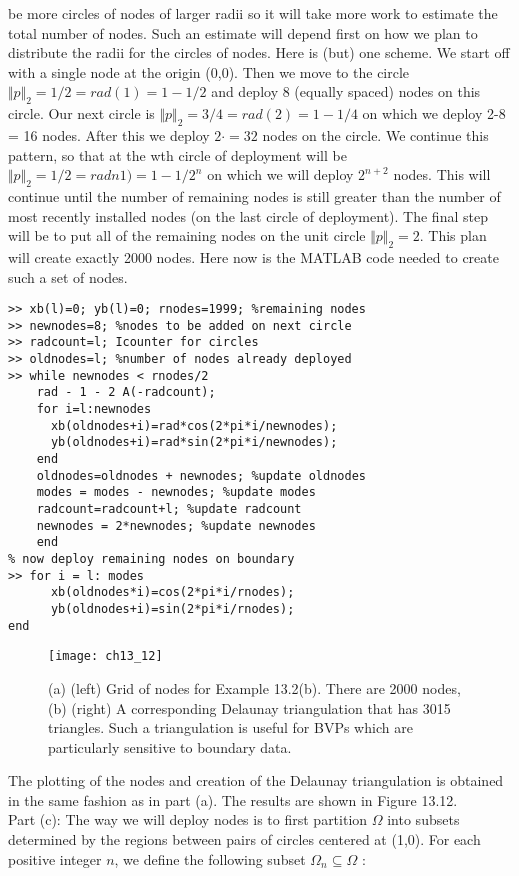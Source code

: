 \documentclass[../main.tex]{subfiles}
\begin{document}
be more circles of nodes of larger radii so it will take more work to estimate the total number of nodes. Such an estimate will depend first on how we plan to distribute the radii for the circles of nodes. Here is (but) one scheme. We start off with a single node at the origin (0,0). Then we move to the circle $\Vert p \Vert_2 =1/2=rad(1)=1-1/2$ and deploy 8 (equally spaced) nodes on this circle. Our next circle is $\Vert p \Vert_2 =3/4=rad(2)=1-1/4$ on which we deploy 2-8 = 16 nodes. After this we deploy $2\cdot = 32$ nodes on the circle. We continue this pattern, so that at the wth circle of deployment will be $\Vert p \Vert_2 =1/2=radn1)=1-1/2^n$ on which we will deploy $2^{n+2}$ nodes. This will continue until the number of remaining nodes is still greater than the number of most recently installed nodes (on the last circle of deployment). The final step will be to put all of the remaining nodes on the unit circle $\Vert p \Vert_2 =2$. This plan will create exactly 2000 nodes. Here now is the MATLAB code needed to create such a set of nodes. 

\begin{lstlisting}[numbers=none,frame=none]
>> xb(l)=0; yb(l)=0; rnodes=1999; %remaining nodes 
>> newnodes=8; %nodes to be added on next circle 
>> radcount=l; Icounter for circles 
>> oldnodes=l; %number of nodes already deployed 
>> while newnodes < rnodes/2 
	rad - 1 - 2 A(-radcount); 
	for i=l:newnodes 
	  xb(oldnodes+i)=rad*cos(2*pi*i/newnodes); 
	  yb(oldnodes+i)=rad*sin(2*pi*i/newnodes); 
	end 
	oldnodes=oldnodes + newnodes; %update oldnodes 
	modes = modes - newnodes; %update modes 
	radcount=radcount+l; %update radcount 
	newnodes = 2*newnodes; %update newnodes 
	end 
% now deploy remaining nodes on boundary 
>> for i = l: modes 
	  xb(oldnodes*i)=cos(2*pi*i/rnodes); 
	  yb(oldnodes+i)=sin(2*pi*i/rnodes); 
end
\end{lstlisting}

\begin{figure}[H]
	\centering
	\texttt{[image: ch13\_12]}
	\caption{\textsf{ (a) (left) Grid of nodes for Example 13.2(b). There are 2000 nodes, (b) (right) A corresponding Delaunay triangulation that has 3015 triangles. Such a triangulation is useful for BVPs which are particularly sensitive to boundary data.}}
	\label{pfig:ch13_12}
\end{figure}

The plotting of the nodes and creation of the Delaunay triangulation is obtained in the same fashion as in part (a). The results are shown in Figure 13.12. 
\\
Part (c): The way we will deploy nodes is to first partition $\Omega$ into subsets determined by the regions between pairs of circles centered at (1,0). For each positive integer $n$, we define the following subset $\Omega_n \subseteq \Omega$ : 
\end{document}
